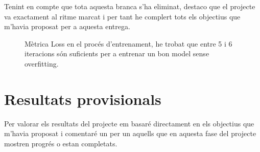 \documentclass[10pt,a4paper,twocolumn,twoside]{article}
\begin{document}
Tenint en compte que tota aquesta branca s'ha eliminat, destaco que el projecte va exactament al ritme marcat i per tant he complert 
tots els objectius que m'havia proposat per a aquesta entrega.


\begin{figure}[h]
\centering
{}
    \caption{Mètrica Loss en el procés d'entrenament, he trobat que entre 5 i 6 iteracions són suficients per a entrenar un bon model sense overfitting. }
    \label{fig-loss-graph}
\end{figure}
\section{Resultats provisionals}

Per valorar els resultats del projecte em basaré directament en els objectius que m'havia proposat i comentaré un per un aquells 
que en aquesta fase del projecte mostren progrés o estan completats.
\end{document}
